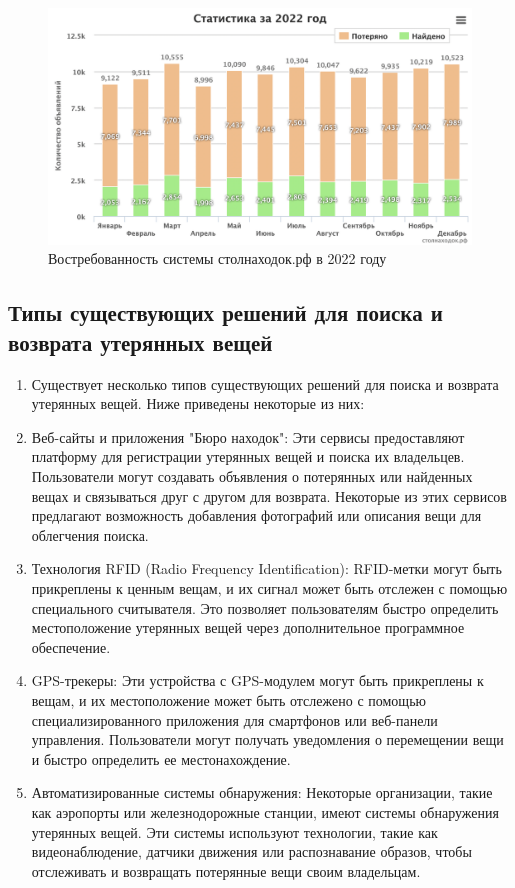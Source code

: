 \documentclass{mirea}
\begin{document}
\begin{figure}[htb]
	\centering
	\includegraphics[width=.95\textwidth]{images/chart2022}
	\parskip=6pt
	\caption{Востребованность системы столнаходок.рф в 2022 году}
	\label{fig:chart2022}
\end{figure}

\subsection{Типы существующих решений для поиска и возврата утерянных вещей}

\begin{enumerate}
	\item[] Существует несколько типов существующих решений для поиска и возврата утерянных вещей. Ниже приведены некоторые из них:
	
	\item Веб-сайты и приложения "Бюро находок": Эти сервисы предоставляют платформу для регистрации утерянных вещей и поиска их владельцев. Пользователи могут создавать объявления о потерянных или найденных вещах и связываться друг с другом для возврата. Некоторые из этих сервисов предлагают возможность добавления фотографий или описания вещи для облегчения поиска.
	
	\item Технология RFID (Radio Frequency Identification): RFID-метки могут быть прикреплены к ценным вещам, и их сигнал может быть отслежен с помощью специального считывателя. Это позволяет пользователям быстро определить местоположение утерянных вещей через дополнительное программное обеспечение.
	
	\item GPS-трекеры: Эти устройства с GPS-модулем могут быть прикреплены к вещам, и их местоположение может быть отслежено с помощью специализированного приложения для смартфонов или веб-панели управления. Пользователи могут получать уведомления о перемещении вещи и быстро определить ее местонахождение.
	
	\item Автоматизированные системы обнаружения: Некоторые организации, такие как аэропорты или железнодорожные станции, имеют системы обнаружения утерянных вещей. Эти системы используют технологии, такие как видеонаблюдение, датчики движения или распознавание образов, чтобы отслеживать и возвращать потерянные вещи своим владельцам.
\end{enumerate}
\end{document}

